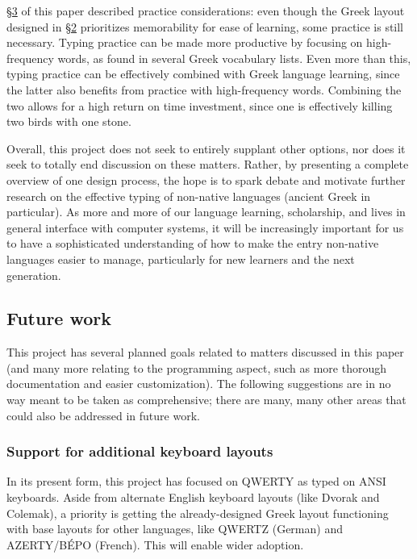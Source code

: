 \documentclass[11pt]{article}
\begin{document}
\hyperref[sec:org762056f]{§3} of this paper described practice considerations: even though the Greek layout designed in \hyperref[sec:org5623cd4]{§2} prioritizes memorability for ease of learning, some practice is still necessary. Typing practice can be made more productive by focusing on high-frequency words, as found in several Greek vocabulary lists. Even more than this, typing practice can be effectively combined with Greek language learning, since the latter also benefits from practice with high-frequency words. Combining the two allows for a high return on time investment, since one is effectively killing two birds with one stone.

Overall, this project does not seek to entirely supplant other options, nor does it seek to totally end discussion on these matters. Rather, by presenting a complete overview of one design process, the hope is to spark debate and motivate further research on the effective typing of non-native languages (ancient Greek in particular). As more and more of our language learning, scholarship, and lives in general interface with computer systems, it will be increasingly important for us to have a sophisticated understanding of how to make the entry non-native languages easier to manage, particularly for new learners and the next generation.

\subsection{Future work}
\label{sec:orgbd1d922}

This project has several planned goals related to matters discussed in this paper (and many more relating to the programming aspect, such as more thorough documentation and easier customization). The following suggestions are in no way meant to be taken as comprehensive; there are many, many other areas that could also be addressed in future work.

\subsubsection{Support for additional keyboard layouts}
\label{sec:org28bb9c1}

In its present form, this project has focused on QWERTY as typed on ANSI keyboards. Aside from alternate English keyboard layouts (like Dvorak and Colemak), a priority is getting the already-designed Greek layout functioning with base layouts for other languages, like QWERTZ (German) and AZERTY/BÉPO (French). This will enable wider adoption.
\end{document}
